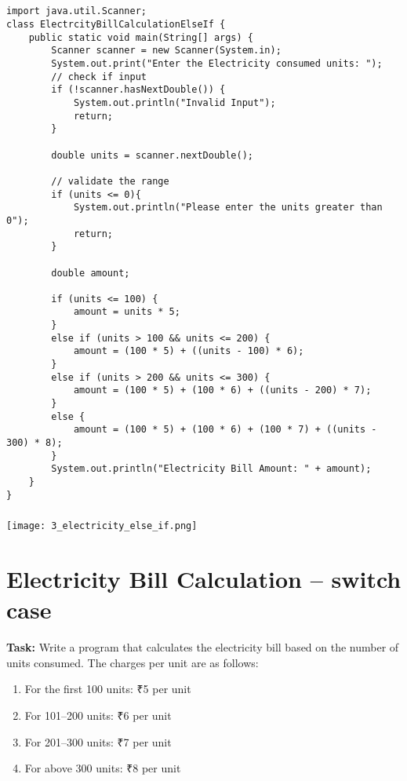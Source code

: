 \documentclass[12pt,a4paper]{article}
\begin{document}
\subsection{}
\begin{lstlisting}
import java.util.Scanner;
class ElectrcityBillCalculationElseIf {
    public static void main(String[] args) {
        Scanner scanner = new Scanner(System.in);
        System.out.print("Enter the Electricity consumed units: ");
        // check if input 
        if (!scanner.hasNextDouble()) {
            System.out.println("Invalid Input");
            return;
        }
    
        double units = scanner.nextDouble();
    
        // validate the range
        if (units <= 0){
            System.out.println("Please enter the units greater than 0");
            return;
        }
        
        double amount;
    
        if (units <= 100) {
            amount = units * 5;
        }
        else if (units > 100 && units <= 200) {
            amount = (100 * 5) + ((units - 100) * 6);
        }
        else if (units > 200 && units <= 300) {
            amount = (100 * 5) + (100 * 6) + ((units - 200) * 7); 
        }
        else {
            amount = (100 * 5) + (100 * 6) + (100 * 7) + ((units - 300) * 8);
        }
        System.out.println("Electricity Bill Amount: " + amount);
    }
}
\end{lstlisting}

\subsubsection{}
\begin{center}
    \texttt{[image: 3\_electricity\_else\_if.png]}
\end{center}

\section{Electricity Bill Calculation -- switch case}
\textbf{Task:} Write a program that calculates the electricity bill based on the number of units consumed. The charges per unit are as follows:
\begin{enumerate}
    \item For the first 100 units: ₹5 per unit
    \item For 101--200 units: ₹6 per unit
    \item For 201--300 units: ₹7 per unit
    \item For above 300 units: ₹8 per unit
\end{enumerate}
\end{document}
